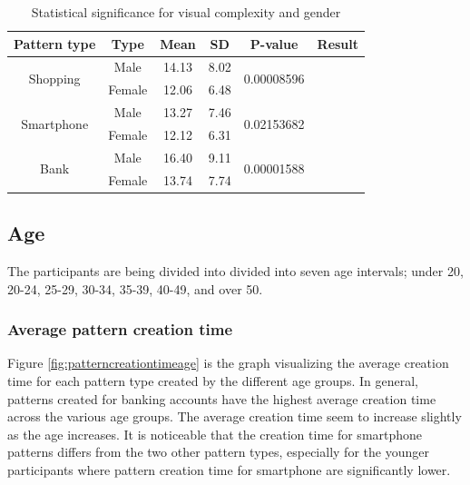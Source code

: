     \begin{table}[H]
      \centering
      \begin{tabular}{ c | c | c | c | c | c }
      \hline
        {\bf Pattern type} & {\bf Type} & {\bf Mean} & {\bf SD} & {\bf P-value} & {\bf Result} \\ \hline
        \multirow{2}{*}{Shopping}   & Male   & 14.13 & 8.02 & \multirow{2}{*}{0.00008596} & \multirow{2}{*}{\bf \color{olive}{Significant}} \\
                                    & Female & 12.06 & 6.48 & & \\ \hline
        \multirow{2}{*}{Smartphone} & Male   & 13.27 & 7.46 & \multirow{2}{*}{0.02153682} & \multirow{2}{*}{\bf \color{olive}{Significant}} \\
                                    & Female & 12.12 & 6.31 & & \\ \hline
        \multirow{2}{*}{Bank}       & Male   & 16.40 & 9.11 & \multirow{2}{*}{0.00001588} & \multirow{2}{*}{\bf \color{olive}{Significant}} \\
                                    & Female & 13.74 & 7.74 & & \\ \hline
      \end{tabular}
      \caption{Statistical significance for visual complexity and gender}
      \label{tab:statsigComplexityGender}
    \end{table}

	\subsection{Age}

    The participants are being divided into divided into seven age intervals; under 20, 20-24, 25-29, 30-34, 35-39, 40-49, and over 50. 

    \subsubsection{Average pattern creation time}
    Figure \ref{fig:patterncreationtimeage} is the graph visualizing the average creation time for each pattern type created by the different age groups. In general, patterns created for banking accounts have the highest average creation time across the various age groups. The average creation time seem to increase slightly as the age increases. It is noticeable that the creation time for smartphone patterns differs from the two other pattern types, especially for the younger participants where pattern creation time for smartphone are significantly lower. 

